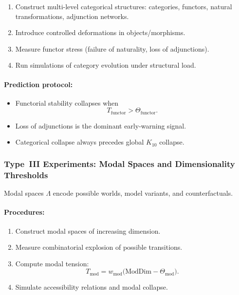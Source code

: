 \begin{enumerate}
    \item Construct multi-level categorical structures:
          categories, functors, natural transformations,
          adjunction networks.
    \item Introduce controlled deformations in objects/morphisms.
    \item Measure functor stress
          (failure of naturality, loss of adjunctions).
    \item Run simulations of category evolution under structural load.
\end{enumerate}

\paragraph{Prediction protocol:}

\begin{itemize}
    \item Functorial stability collapses when
          \[
              T_{\mathrm{functor}} > \Theta_{\mathrm{functor}}.
          \]
    \item Loss of adjunctions is the dominant early-warning signal.
    \item Categorical collapse always precedes global
          $K_{10}$ collapse.
\end{itemize}



\subsubsection{Type~III Experiments: Modal Spaces and Dimensionality Thresholds}

Modal spaces $\Lambda$ encode possible worlds, model variants, and
counterfactuals.

\paragraph{Procedures:}

\begin{enumerate}
    \item Construct modal spaces of increasing dimension.
    \item Measure combinatorial explosion of possible transitions.
    \item Compute modal tension:
          \[
              T_{\mathrm{mod}} =
              w_{\mathrm{mod}}\bigl(
                  \mathrm{ModDim} - \Theta_{\mathrm{mod}}
              \bigr).
          \]
    \item Simulate accessibility relations and modal collapse.
\end{enumerate}

